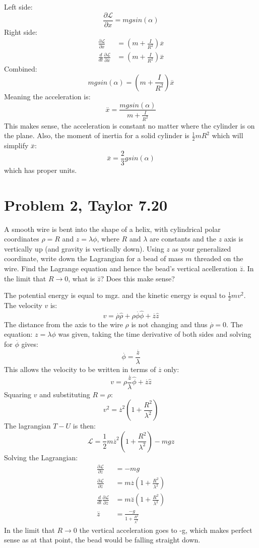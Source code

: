 \documentclass[a4paper,12pt]{article}
\newcommand{\F}[2]{\ensuremath{\frac{#1}{#2}}}
\newcommand{\Q}[1]{\newpage \section*{#1}}
\newcommand{\vel}[1]{\overset{.}{#1}}
\newcommand{\acc}[1]{\overset{..}{#1}}
\newcommand{\LP}{\left(}
\newcommand{\RP}{\right)}
\begin{document}
Left side:
\[\F{\partial{\mathcal{L}}}{\partial{x}}=mgsin(\alpha)\]
Right side:
\begin{align*}
\F{\partial{\mathcal{L}}}{\partial{\vel{x}}}&=\LP m+\F{I}{R^2}\RP\vel{x}\\
\F{d}{dt}\F{\partial{\mathcal{L}}}{\partial{\vel{x}}}&=\LP m+\F{I}{R^2}\RP\acc{x}
\end{align*}
Combined:
\[mgsin(\alpha)=\LP m+\F{I}{R^2}\RP\acc{x}\]
Meaning the acceleration is:
\[\acc{x}=\F{mgsin(\alpha)}{m+\F{I}{R^2}}\]
This makes sense, the acceleration is constant no matter where the cylinder is on the plane.  Also, the moment of inertia for a solid cylinder is $\F{1}{2}mR^2$ which will simplify $\acc{x}$:
\[\acc{x}=\F{2}{3}gsin(\alpha)\]
which has proper units.
\Q{Problem 2, Taylor 7.20}
A smooth wire is bent into the shape of a helix, with cylindrical polar coordinates $\rho=R$ and $z=\lambda\phi$, where $R$ and $\lambda$ are constants and the $z$ axis is vertically up (and gravity is vertically down).  Using $z$ as your generalized coordinate, write down the Lagrangian for a bead of mass $m$ threaded on the wire.  Find the Lagrange equation and hence the bead's vertical acelleration $\acc{z}$. In the limit that $R\rightarrow0$, what is $\acc{z}$? Does this make sense?

The potential energy is equal to mgz. and the kinetic energy is equal to $\F{1}{2}mv^2$.  The velocity $v$ is:
\[v=\vel{\rho}\hat{\rho}+\rho\vel{\phi}\hat{\phi}+\vel{z}\hat{z}\]
The distance from the axis to the wire $\rho$ is not changing and thus $\vel{\rho}=0$.  The equation: $z=\lambda\phi$ was given, taking the time derivative of both sides and solving for $\vel{\phi}$ gives:
\[\vel{\phi}=\F{\vel{z}}{\lambda}\]
This allows the velocity to be written in terms of $\vel{z}$ only:
\[v=\rho\F{\vel{z}}{\lambda}\hat{\phi}+\vel{z}\hat{z}\]
Squaring $v$ and substituting $R=\rho$:
\[v^2=\vel{z}^2\LP1+\F{R^2}{\lambda^2}\RP\]
The lagrangian $T-U$ is then:
\[\mathcal{L}=\F{1}{2}m\vel{z}^2\LP1+\F{R^2}{\lambda^2}\RP-mgz\]
\newpage 
Solving the Lagrangian:
\begin{align*}
\F{\partial{\mathcal{L}}}{\partial{z}}&=-mg\\
\F{\partial{\mathcal{L}}}{\partial{\vel{z}}}&=m\vel{z}\LP1+\F{R^2}{\lambda^2}\RP\\
\F{d}{dt}\F{\partial{\mathcal{L}}}{\partial{\vel{z}}}&=m\acc{z}\LP1+\F{R^2}{\lambda^2}\RP\\
\acc{z}&=\F{-g}{1+\F{R^2}{\lambda^2}}
\end{align*}
In the limit that $R\rightarrow0$ the vertical acceleration goes to -g, which makes perfect sense as at that point, the bead would be falling straight down.
\end{document}
